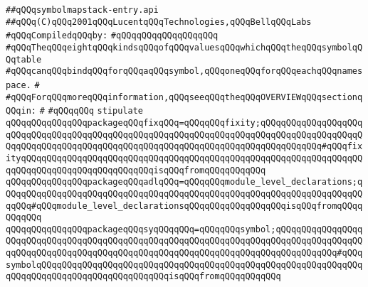 \label{src/lib/compiler/front/typer-stuff/symbolmapstack/symbolmapstack-entry.api}
\verb|##qQQqsymbolmapstack-entry.api|\newline
\verb|##qQQq(C)qQQq2001qQQqLucentqQQqTechnologies,qQQqBellqQQqLabs|\newline
\newline
\verb|#qQQqCompiledqQQqby:|\newline
\verb|#qQQqqQQqqQQqqQQqqQQq|\newline
\newline
\newline
\newline
\verb|#qQQqTheqQQqeightqQQqkindsqQQqofqQQqvaluesqQQqwhichqQQqtheqQQqsymbolqQQqtable|\newline
\verb|#qQQqcanqQQqbindqQQqforqQQqaqQQqsymbol,qQQqoneqQQqforqQQqeachqQQqnamespace.|\newline
\verb|#|\newline
\verb|#qQQqForqQQqmoreqQQqinformation,qQQqseeqQQqtheqQQqOVERVIEWqQQqsectionqQQqin:|\newline
\verb|#|\newline
\verb|#qQQqqQQq|\newline
\newline
\newline
\verb|stipulate|\newline
\verb|qQQqqQQqqQQqqQQqpackageqQQqfixqQQq=qQQqqQQqfixity;qQQqqQQqqQQqqQQqqQQqqQQqqQQqqQQqqQQqqQQqqQQqqQQqqQQqqQQqqQQqqQQqqQQqqQQqqQQqqQQqqQQqqQQqqQQqqQQqqQQqqQQqqQQqqQQqqQQqqQQqqQQqqQQqqQQqqQQqqQQqqQQqqQQqqQQq#qQQqfixityqQQqqQQqqQQqqQQqqQQqqQQqqQQqqQQqqQQqqQQqqQQqqQQqqQQqqQQqqQQqqQQqqQQqqQQqqQQqqQQqqQQqqQQqqQQqqQQqisqQQqfromqQQqqQQqqQQq|\newline
\verb|qQQqqQQqqQQqqQQqpackageqQQqadlqQQq=qQQqqQQqmodule_level_declarations;qQQqqQQqqQQqqQQqqQQqqQQqqQQqqQQqqQQqqQQqqQQqqQQqqQQqqQQqqQQqqQQqqQQqqQQqqQQq#qQQqmodule_level_declarationsqQQqqQQqqQQqqQQqqQQqisqQQqfromqQQqqQQqqQQq|\newline
\verb|qQQqqQQqqQQqqQQqpackageqQQqsyqQQqqQQq=qQQqqQQqsymbol;qQQqqQQqqQQqqQQqqQQqqQQqqQQqqQQqqQQqqQQqqQQqqQQqqQQqqQQqqQQqqQQqqQQqqQQqqQQqqQQqqQQqqQQqqQQqqQQqqQQqqQQqqQQqqQQqqQQqqQQqqQQqqQQqqQQqqQQqqQQqqQQqqQQqqQQq#qQQqsymbolqQQqqQQqqQQqqQQqqQQqqQQqqQQqqQQqqQQqqQQqqQQqqQQqqQQqqQQqqQQqqQQqqQQqqQQqqQQqqQQqqQQqqQQqqQQqqQQqisqQQqfromqQQqqQQqqQQq|\newline
